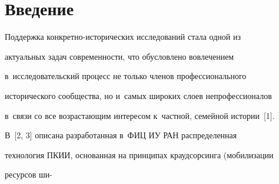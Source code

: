 














 \thispagestyle{headings}


 


 \vspace*{-18pt}


  


\section{Введение}





\vspace*{-4pt}





  Поддержка конкретно-исторических исследований стала одной из 


актуальных задач современности, что обусловлено вовлечением 


в~исследовательский процесс не только членов профессионального 


исторического сообщества, но и~самых широких слоев непрофессионалов 


в~связи со все возрастающим интересом к~частной, семейной истории~[1].


  


  В~[2, 3] описана разработанная в~ФИЦ ИУ РАН распределенная 


технология ПКИИ, основанная на принципах краудсорсинга (мобилизации 


ресурсов ши-\linebreak\vspace*{-12pt}





\pagebreak





